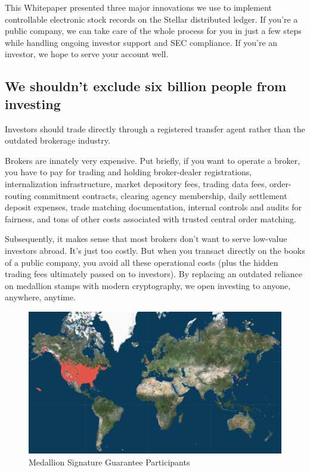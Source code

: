 \documentclass[11pt, english]{article}
\begin{document}
\begin{multicols}{2}
This Whitepaper presented three major innovations we use to implement controllable electronic stock records on the Stellar distributed ledger. If you're a public company, we can take care of the whole process for you in just a few steps while handling ongoing investor support and SEC compliance. If you're an investor, we hope to serve your account well.


\subsection{We shouldn't exclude six billion people from investing}

Investors should trade directly through a registered transfer agent rather than the outdated brokerage industry. 

Brokers are innately very expensive. Put briefly, if you want to operate a broker, you have to pay for trading and holding broker-dealer registrations, internalization infrastructure, market depository fees, trading data fees, order-routing commitment contracts, clearing agency membership, daily settlement deposit expenses, trade matching documentation, internal controls and audits for fairness, and tons of other costs associated with trusted central order matching.

Subsequently, it makes sense that most brokers don't want to serve low-value investors abroad. It's just too costly. But when you transact directly on the books of a public company, you avoid all these operational costs (plus the hidden trading fees ultimately passed on to investors). By replacing an outdated reliance on medallion stamps with modern cryptography, we open investing to anyone, anywhere, anytime.

\end{multicols}

\begin{figure}[H]
    \centering
    \includegraphics[width=420pt]{msg-map.jpg}
    \caption{Medallion Signature Guarantee Participants \cite{MSG_2022}}
\end{figure}
\end{document}
